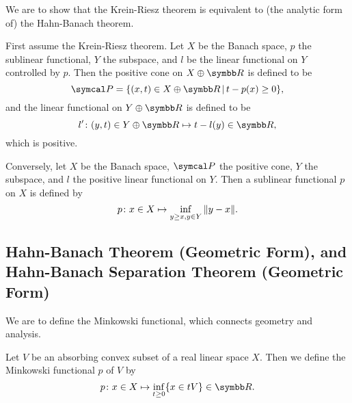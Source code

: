 \begin{remark}
  We are to show that the Krein-Riesz theorem is equivalent to (the analytic form of) the Hahn-Banach theorem.

  First assume the Krein-Riesz theorem. Let $X$ be the Banach space, $p$ the sublinear functional, $Y$ the subspace, and $l$ be the linear functional on $Y$ controlled by $p$. Then the positive cone on $X\oplus \RR$ is defined to be
  \begin{equation*}
    \CONE P=\{(x,t)\in X\oplus \RR\VERT t-p(x)\geq 0\},
  \end{equation*}
  and the linear functional on $Y\oplus \RR$ is defined to be
  \begin{equation*}
    l'\colon (y, t)\in Y\oplus \RR\mapsto t-l(y)\in\RR,
  \end{equation*}
  which is positive.

  Conversely, let $X$ be the Banach space, $\CONE P$ the positive cone, $Y$ the subspace, and $l$ the positive linear functional on $Y$. Then a sublinear functional $p$ on $X$ is defined by
  \begin{equation*}
    p\colon x\in X\mapsto \inf_{y\geq x, y\in Y}\Vert y-x\Vert.
  \end{equation*}
\end{remark}

\subsection{Hahn-Banach Theorem (Geometric Form), and Hahn-Banach Separation Theorem (Geometric Form)}

We are to define the Minkowski functional, which connects geometry and analysis.

\begin{definition}
  Let $V$ be an absorbing convex subset of a real linear space $X$. Then we define the Minkowski functional $p$ of $V$ by
  \begin{equation*}
    p\colon x\in X\mapsto \inf_{t\geq 0}\{x\in tV\}\in\RR.
  \end{equation*}
\end{definition}


